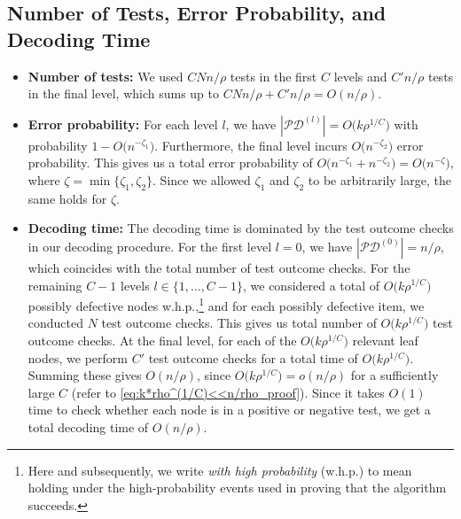 
\subsection{Number of Tests, Error Probability, and Decoding Time}

\begin{itemize}
    \item \textbf{Number of tests:} We used $CNn/\rho$ tests in the first $C$ levels and $C'n/\rho$ tests in the final level, which sums up to $CNn/\rho+C'n/\rho=O(n/\rho)$.
    \item \textbf{Error probability:} For each level $l$, we have $|\mathcal{PD}^{(l)}|=O\big(k\rho^{1/C}\big)$ with probability $1-O\big(n^{-\zeta_1}\big)$. Furthermore, the final level incurs $O\big(n^{-\zeta_2}\big)$ error probability. This gives us a total error probability of $O\big(n^{-\zeta_1}+n^{-\zeta_2}\big)=O\big(n^{-\zeta}\big)$, where $\zeta=\min\{\zeta_1,\zeta_2\}$.  Since we allowed $\zeta_1$ and $\zeta_2$ to be arbitrarily large, the same holds for $\zeta$.
    \item \textbf{Decoding time:} The decoding time is dominated by the test outcome checks in our decoding procedure. For the first level $l=0$, we have $|\mathcal{PD}^{(0)}|=n/\rho$, which coincides with the total number of test outcome checks. For the remaining $C-1$ levels $l\in\{1,\dots,C-1\}$, we considered a total of $O\big(k\rho^{1/C}\big)$ possibly defective nodes w.h.p.,\footnote{Here and subsequently, we write {\em with high probability} (w.h.p.) to mean holding under the high-probability events used in proving that the algorithm succeeds.} and for each possibly defective item, we conducted $N$ test outcome checks. This gives us total number of $O\big(k\rho^{1/C}\big)$ test outcome checks. At the final level, for each of the $O\big(k\rho^{1/C}\big)$ relevant leaf nodes, we perform $C'$ test outcome checks for a total time of $O\big(k\rho^{1/C}\big)$. Summing these gives $O(n/\rho)$, since $O\big(k\rho^{1/C}\big)=o(n/\rho)$ for a sufficiently large $C$ (refer to \eqref{eq:k*rho^(1/C)<<n/rho_proof}). Since it takes $O(1)$ time to check whether each node is in a positive or negative test, we get a total decoding time of $O(n/\rho)$.

\end{itemize}
